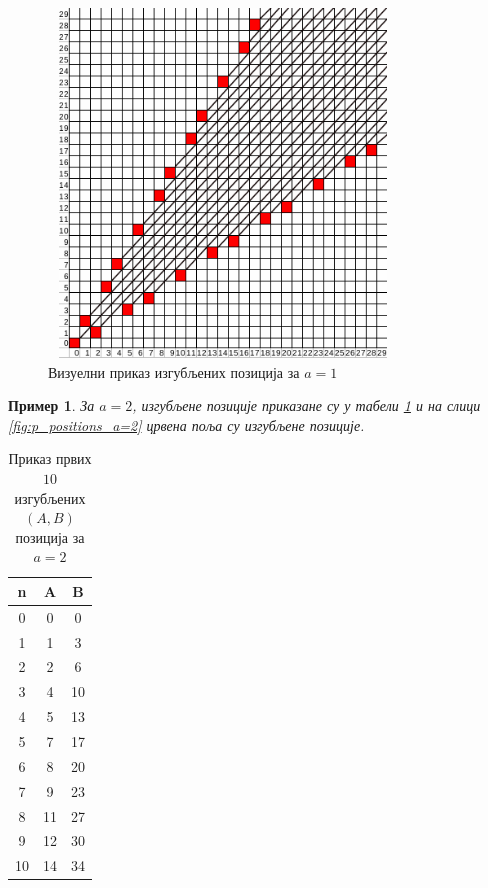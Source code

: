\documentclass[a4paper]{article}
\newtheorem{example}{Пример}
\begin{document}
\begin{figure}[H]
	\caption{Визуелни приказ изгубљених позиција за $ a = 1 $}
	\label{fig:p_positions_a=1}
	\begin{center}
		\includegraphics[width=350px, height=350px]{p_positions_a=1.png}
	\end{center}
\end{figure}

\begin{example}
	За $ a = 2 $, изгубљене позиције приказане су у табели \ref{tab:a_2_Ppozicije} и на слици \ref{fig:p_positions_a=2} црвена поља су изгубљене позиције.
\end{example}

\begin{table}[h!]
	\caption{Приказ првих $ 10 $ изгубљених $ (A, B) $ позиција за $ a = 2 $}
	\label{tab:a_2_Ppozicije}
	\begin{center}
		\begin{tabular}{  c | c | c }
			{\textbf{n}} &  {\textbf{A}} &  {\textbf{B}} \\
			\hline
			0 & 0 & 0 \\
			1 & 1 & 3 \\
			2 & 2 & 6 \\
			3 & 4 & 10 \\
			4 & 5 & 13 \\
			5 & 7 & 17 \\
			6 & 8 & 20 \\
			7 & 9 & 23 \\
			8 & 11 & 27 \\
			9 & 12 & 30 \\
			10 & 14 & 34\\ 
		\end{tabular}
	\end{center}
\end{table}
\end{document}
